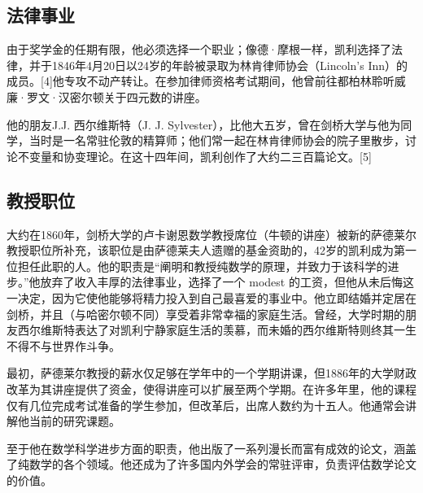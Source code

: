 \subsection{法律事业}  
由于奖学金的任期有限，他必须选择一个职业；像德·摩根一样，凯利选择了法律，并于1846年4月20日以24岁的年龄被录取为林肯律师协会（Lincoln's Inn）的成员。[4]他专攻不动产转让。在参加律师资格考试期间，他曾前往都柏林聆听威廉·罗文·汉密尔顿关于四元数的讲座。

他的朋友J.J. 西尔维斯特（J. J. Sylvester），比他大五岁，曾在剑桥大学与他为同学，当时是一名常驻伦敦的精算师；他们常一起在林肯律师协会的院子里散步，讨论不变量和协变理论。在这十四年间，凯利创作了大约二三百篇论文。[5]
\subsection{教授职位}  
大约在1860年，剑桥大学的卢卡谢恩数学教授席位（牛顿的讲座）被新的萨德莱尔教授职位所补充，该职位是由萨德莱夫人遗赠的基金资助的，42岁的凯利成为第一位担任此职的人。他的职责是“阐明和教授纯数学的原理，并致力于该科学的进步。”他放弃了收入丰厚的法律事业，选择了一个 modest 的工资，但他从未后悔这一决定，因为它使他能够将精力投入到自己最喜爱的事业中。他立即结婚并定居在剑桥，并且（与哈密尔顿不同）享受着非常幸福的家庭生活。曾经，大学时期的朋友西尔维斯特表达了对凯利宁静家庭生活的羡慕，而未婚的西尔维斯特则终其一生不得不与世界作斗争。

最初，萨德莱尔教授的薪水仅足够在学年中的一个学期讲课，但1886年的大学财政改革为其讲座提供了资金，使得讲座可以扩展至两个学期。在许多年里，他的课程仅有几位完成考试准备的学生参加，但改革后，出席人数约为十五人。他通常会讲解他当前的研究课题。

至于他在数学科学进步方面的职责，他出版了一系列漫长而富有成效的论文，涵盖了纯数学的各个领域。他还成为了许多国内外学会的常驻评审，负责评估数学论文的价值。

